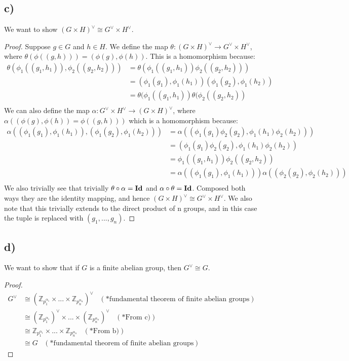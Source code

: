 \documentclass{article}
\begin{document}
\subsection*{c)}
We want to show $(G \times H)^\vee\cong G^\vee\times H^\vee$.
\begin{proof}
Suppose $g\in G$ and $h\in H$. We define the map $\theta:(G \times H)^\vee\rightarrow G^\vee\times H^\vee$, where $\theta(\phi((g,h)))=(\phi(g),\phi(h))$. This is a homomorphism because:
\begin{align*}
\theta(\phi_1((g_1,h_1)),\phi_2((g_2,h_2)))&=\theta(\phi_1((g_1,h_1))\phi_2((g_2,h_2)))\\
&=(\phi_1(g_1),\phi_1(h_1))(\phi_1(g_2),\phi_1(h_2))\\
&=\theta(\phi_1((g_1,h_1))\theta(\phi_2((g_2,h_2))\\
\end{align*}
We can also define the map $\alpha:G^\vee\times H^\vee\rightarrow(G \times H)^\vee$, where $\alpha((\phi(g),\phi(h))=\phi((g,h)))$ which is a homomorphism because:
\begin{align*}
\alpha((\phi_1(g_1),\phi_1(h_1)),(\phi_1(g_2),\phi_1(h_2)))&=\alpha((\phi_1(g_1)\phi_2(g_2),\phi_1(h_1)\phi_2(h_2)))\\
&=(\phi_1(g_1)\phi_2(g_2),\phi_1(h_1)\phi_2(h_2))\\
&=\phi_1((g_1,h_1))\phi_2((g_2,h_2))\\
&=\alpha((\phi_1(g_1),\phi_1(h_1)))\alpha((\phi_2(g_2),\phi_2(h_2)))\\
\end{align*}
We also trivially see that trivially $\theta\circ\alpha=\bold{Id}$ and $\alpha\circ\theta=\bold{Id}$. Composed both ways they are the identity mapping, and hence $(G \times H)^\vee\cong G^\vee\times H^\vee$. We also note that this trivially extends to the direct product of n groups, and in this case the tuple is replaced with $(g_1,...,g_n)$.
\end{proof}
\subsection*{d)}
We want to show that if $G$ is a finite abelian group, then $G^\vee\cong G$.
\begin{proof}
\begin{align*}
G^\vee&\cong(\mathbb{Z}_{p_1^{\alpha_1}}\times...\times\mathbb{Z}_{p_n^{\alpha_n}})^\vee\;\;\;(*\text{fundamental theorem of finite abelian groups})\\
&\cong(\mathbb{Z}_{p_1^{\alpha_1}})^\vee\times...\times(\mathbb{Z}_{p_n^{\alpha_n}})^\vee\;\;\;(*\text{From c)})\\
&\cong\mathbb{Z}_{p_1^{\alpha_1}}\times...\times\mathbb{Z}_{p_n^{\alpha_n}}\;\;\;(*\text{From b)})\\
&\cong G\;\;\;(*\text{fundamental theorem of finite abelian groups})
\end{align*}
\end{proof}
\end{document}
